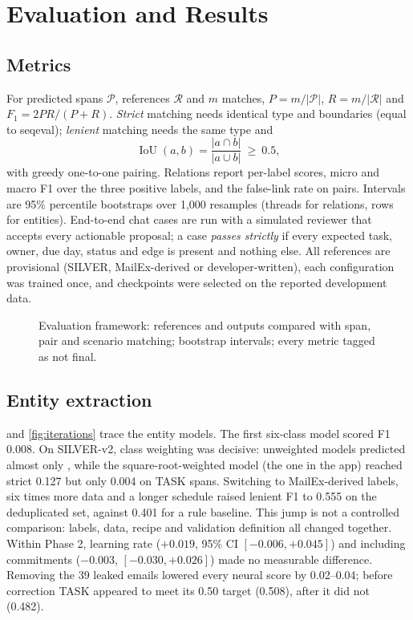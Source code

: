\chapter{Evaluation and Results}
\label{ch:results}

\section{Metrics}
For predicted spans $\mathcal{P}$, references $\mathcal{R}$ and $m$ matches, $P=m/|\mathcal{P}|$, $R=m/|\mathcal{R}|$ and $F_1=2PR/(P+R)$. \emph{Strict} matching needs identical type and boundaries (equal to seqeval); \emph{lenient} matching needs the same type and
\begin{equation}
\operatorname{IoU}(a,b)=\frac{|a\cap b|}{|a\cup b|}\ \ge\ 0.5,
\end{equation}
with greedy one-to-one pairing. Relations report per-label scores, micro and macro F1 over the three positive labels, and the false-link rate on  pairs. Intervals are 95\% percentile bootstraps \citep{efron1993bootstrap} over 1,000 resamples (threads for relations, rows for entities). End-to-end chat cases are run with a simulated reviewer that accepts every actionable proposal; a case \emph{passes strictly} if every expected task, owner, due day, status and edge is present and nothing else. All references are provisional (SILVER, MailEx-derived or developer-written), each configuration was trained once, and checkpoints were selected on the reported development data.


\begin{figure}[htbp]
\centering
{}
\caption{Evaluation framework: references and outputs compared with span, pair and scenario matching; bootstrap intervals; every metric tagged as not final.}
\label{fig:evalfw}
\end{figure}
\section{Entity extraction}
 and \cref{fig:iterations} trace the entity models. The first six-class model scored F1 0.008. On SILVER-v2, class weighting was decisive: unweighted models predicted almost only , while the square-root-weighted model (the one in the app) reached strict 0.127 but only 0.004 on TASK spans. Switching to MailEx-derived labels, six times more data and a longer schedule raised lenient F1 to 0.555 on the deduplicated set, against 0.401 for a rule baseline. This jump is not a controlled comparison: labels, data, recipe and validation definition all changed together. Within Phase 2, learning rate ($+0.019$, 95\% CI $[-0.006, +0.045]$) and including commitments ($-0.003$, $[-0.030,+0.026]$) made no measurable difference. Removing the 39 leaked emails lowered every neural score by 0.02--0.04; before correction TASK appeared to meet its 0.50 target (0.508), after it did not (0.482).

